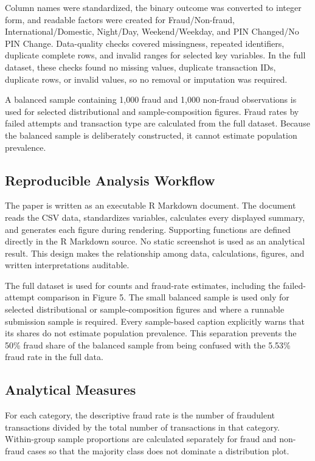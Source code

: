 \documentclass[conference,final,]{IEEEtran}
\begin{document}
Column names were standardized, the binary outcome was converted to
integer form, and readable factors were created for Fraud/Non-fraud,
International/Domestic, Night/Day, Weekend/Weekday, and PIN Changed/No
PIN Change. Data-quality checks covered missingness, repeated
identifiers, duplicate complete rows, and invalid ranges for selected
key variables. In the full dataset, these checks found no missing
values, duplicate transaction IDs, duplicate rows, or invalid values, so
no removal or imputation was required.

A balanced sample containing 1,000 fraud and 1,000 non-fraud
observations is used for selected distributional and sample-composition
figures. Fraud rates by failed attempts and transaction type are
calculated from the full dataset. Because the balanced sample is
deliberately constructed, it cannot estimate population prevalence.

\subsection{Reproducible Analysis
Workflow}\label{reproducible-analysis-workflow}

The paper is written as an executable R Markdown document. The document
reads the CSV data, standardizes variables, calculates every displayed
summary, and generates each figure during rendering. Supporting
functions are defined directly in the R Markdown source. No static
screenshot is used as an analytical result. This design makes the
relationship among data, calculations, figures, and written
interpretations auditable.

The full dataset is used for counts and fraud-rate estimates, including
the failed-attempt comparison in Figure 5. The small balanced sample is
used only for selected distributional or sample-composition figures and
where a runnable submission sample is required. Every sample-based
caption explicitly warns that its shares do not estimate population
prevalence. This separation prevents the 50\% fraud share of the
balanced sample from being confused with the 5.53\% fraud rate in the
full data.

\subsection{Analytical Measures}\label{analytical-measures}

For each category, the descriptive fraud rate is the number of
fraudulent transactions divided by the total number of transactions in
that category. Within-group sample proportions are calculated separately
for fraud and non-fraud cases so that the majority class does not
dominate a distribution plot.
\end{document}
